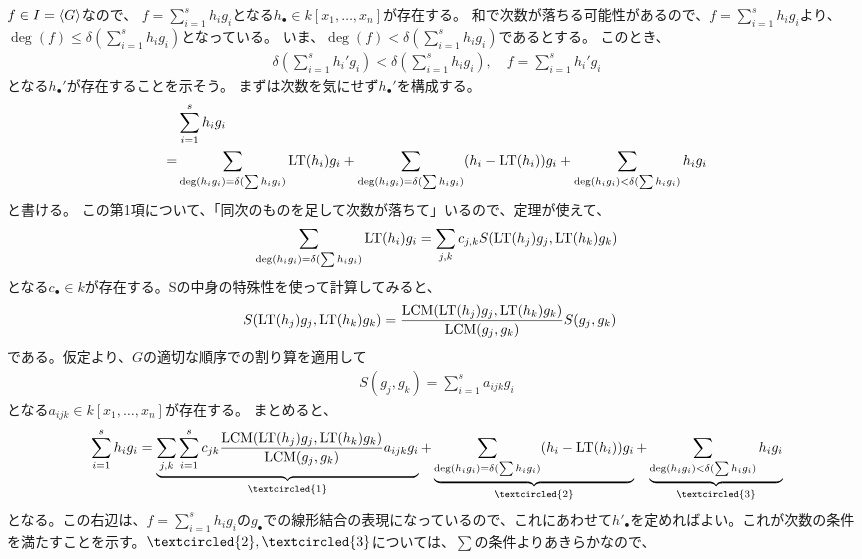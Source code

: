 \documentclass[9pt]{ltjsarticle}
\def\MARU#1{\textcircled{\scriptsize #1}}
\begin{document}
\begin{myproof}
\begin{itemize}
    $f\in I=\left\langle G \right\rangle$なので、
    $f = \sum_{i=1}^s h_i g_i$となる$h_\bullet \in k[x_1,\dots,x_n]$が存在する。
    和で次数が落ちる可能性があるので、$f=\sum_{i=1}^s h_i g_i$より、
    $\deg(f)\le \delta(\sum_{i=1}^s h_i g_i)$となっている。
    いま、$\deg(f) < \delta(\sum_{i=1}^s h_i g_i)$であるとする。
    このとき、
    \begin{align}
      \delta(\sum_{i=1}^s h_i' g_i) < \delta(\sum_{i=1}^s h_i g_i),\quad
      f = \sum_{i=1}^s h_i' g_i
    \end{align}
    となる$h_\bullet'$が存在することを示そう。
    まずは次数を気にせず$h_\bullet'$を構成する。
    \begin{align}
      & \sum_{i=1}^s h_i g_i \\
      =&
      \sum_{\deg(h_ig_i)= \delta(\sum h_i g_i)} {\rm LT}(h_i)g_i
      +
      \sum_{\deg(h_i g_i)=\delta(\sum h_i g_i)} (h_i - {\rm LT}(h_i))g_i
      +
      \sum_{\deg(h_ig_i) < \delta(\sum h_i g_i)} h_i g_i
    \end{align}
    と書ける。
    この第1項について、「同次のものを足して次数が落ちて」いるので、定理が使えて、
    \begin{align}
      \sum_{\deg(h_ig_i)=\delta(\sum h_i g_i)} {\rm LT}(h_i)g_i
       =
       \sum_{j,k} c_{j,k}S({\rm LT}(h_j)g_j, {\rm LT}(h_k)g_k)
    \end{align}
    となる$c_\bullet \in k$が存在する。Sの中身の特殊性を使って計算してみると、
    \begin{align}
      S({\rm LT}(h_j)g_j, {\rm LT}(h_k)g_k)
      &=
      \frac{\mathrm{LCM}({\rm LT}(h_j)g_j, {\rm LT}(h_k)g_k)}{\mathrm{LCM}(g_j,g_k)} S(g_j,g_k)
    \end{align}
    である。仮定より、$G$の適切な順序での割り算を適用して
    \begin{align}
      S(g_j,g_k) = \sum_{i=1}^s a_{ijk}g_i
    \end{align}
    となる$a_{ijk}\in k[x_1,\dots,x_n]$が存在する。
    まとめると、
    \begin{align}
      \sum_{i=1}^s h_i g_i
      =
      \ub{\sum_{j,k}\sum_{i=1}^s c_{jk}\frac{\LCM(\LT(h_j)g_j, \LT(h_k)g_k)}{\LCM(g_j,g_k)} a_{ijk}g_i}_{\MARU{1}}
      +
      \ub{\sum_{\deg(h_i g_i)=\delta(\sum h_i g_i)} (h_i - \LT(h_i))g_i}_{\MARU{2}}
      +
      \ub{\sum_{\deg(h_ig_i) < \delta(\sum h_i g_i)} h_i g_i}_{\MARU{3}}
    \end{align}
    となる。この右辺は、$f=\sum_{i=1}^s h_i g_i$の$g_\bullet$での線形結合の表現になっているので、これにあわせて$h'_\bullet$を定めればよい。これが次数の条件を満たすことを示す。$\MARU{2},\MARU{3}$については、$\sum$の条件よりあきらかなので、

\end{itemize}
\end{myproof}
\end{document}

